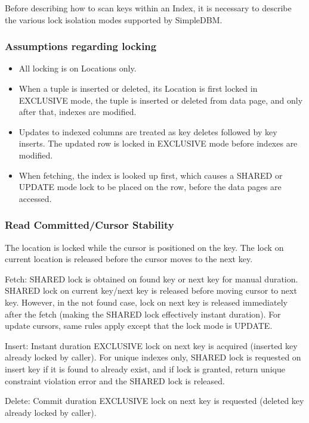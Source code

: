 \documentclass[a4paper,draft,oneside]{book}
\begin{document}
Before describing how to scan keys within an Index, it is necessary to
describe the various lock isolation modes supported by SimpleDBM.

\subsubsection{Assumptions regarding locking}

\begin{itemize}
\item All locking is on Locations only. 
\item When a tuple is inserted or deleted, its Location is first locked in EXCLUSIVE mode, the tuple is inserted or deleted from data page, and only after that, indexes are modified. 
\item Updates to indexed columns are treated as key deletes followed by key inserts. The updated row is locked in EXCLUSIVE mode before indexes are modified. 
\item When fetching, the index is looked up first, which causes a SHARED or UPDATE mode lock to be placed on the row, before the data pages are accessed.
\end{itemize}

\subsubsection{Read Committed/Cursor Stability}

The location is locked while the cursor is positioned on the key. The lock on current location is
released before the cursor moves to the next key.

Fetch: SHARED lock is obtained on found key or next key for manual duration. SHARED lock on current key/next key is released before moving cursor to next key. However, in the not found case, lock on next key is released immediately after the fetch (making the SHARED lock effectively instant duration). For update cursors, same rules apply except that the lock mode is UPDATE. 

Insert: Instant duration EXCLUSIVE lock on next key is acquired (inserted key already locked by caller). For unique indexes only, SHARED lock is requested on insert key if it is found to already exist, and if lock is granted, return unique constraint violation error and the SHARED lock is released. 

Delete: Commit duration EXCLUSIVE lock on next key is requested (deleted key already locked by caller). 
\end{document}
